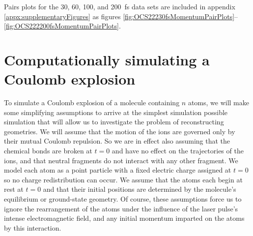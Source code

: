 Pairs plots for the 30, 60, 100, and \SI{200}{\fs} data sets are included in appendix \ref{appx:supplementaryFigures} as figures \ref{fig:OCS22230fsMomentumPairPlots}--\ref{fig:OCS222200fsMomentumPairPlots}.

\section{Computationally simulating a Coulomb explosion} \label{sec:simulating}
To simulate a Coulomb explosion of a molecule containing $n$ atoms, we will make some simplifying assumptions to arrive at the simplest simulation possible simulation that will allow us to investigate the problem of reconstructing geometries. We will assume that the motion of the ions are governed only by their mutual Coulomb repulsion. So we are in effect also assuming that the chemical bonds are broken at $t = 0$ and have no effect on the trajectories of the ions, and that neutral fragments do not interact with any other fragment. We model each atom as a point particle with a fixed  electric charge assigned at $t = 0$ so no charge redistribution can occur. We assume that the atoms each begin at rest at $t = 0$ and that their initial positions are determined by the molecule's equilibrium or ground-state geometry. Of course, these assumptions force us to ignore the rearrangement of the atoms under the influence of the laser pulse's intense electromagnetic field, and any initial momentum imparted on the atoms by this interaction.

